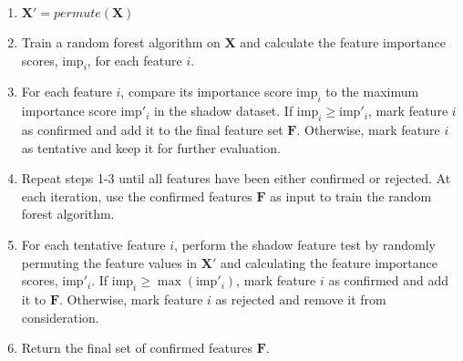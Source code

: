 \documentclass[letterpaper,10pt]{article}
\begin{document}
\begin{enumerate}
    \item $\boldsymbol{X'} = permute(\boldsymbol{X})$
    \item Train a random forest algorithm on $\boldsymbol{X}$ and calculate the feature importance scores, $\text{imp}_i$, for each feature $i$.
    \item For each feature $i$, compare its importance score $\text{imp}_i$ to the maximum importance score $\text{imp}'_i$ in the shadow dataset.
    If $\text{imp}_i \geq \text{imp}'_i$, mark feature $i$ as confirmed and add it to the final feature set $\boldsymbol{F}$. Otherwise, mark feature $i$ as tentative and keep it for further evaluation.
    \item Repeat steps 1-3 until all features have been either confirmed or rejected. At each iteration, use the confirmed features $\boldsymbol{F}$ as input to train the random forest algorithm.
    \item For each tentative feature $i$, perform the shadow feature test by randomly permuting the feature values in $\boldsymbol{X'}$ and calculating the feature importance scores, $\text{imp}'_i$.
    If $\text{imp}_i \geq \max(\text{imp}'_i)$, mark feature $i$ as confirmed and add it to $\boldsymbol{F}$. Otherwise, mark feature $i$ as rejected and remove it from consideration.
    \item Return the final set of confirmed features $\boldsymbol{F}$.
\end{enumerate}
\end{document}

